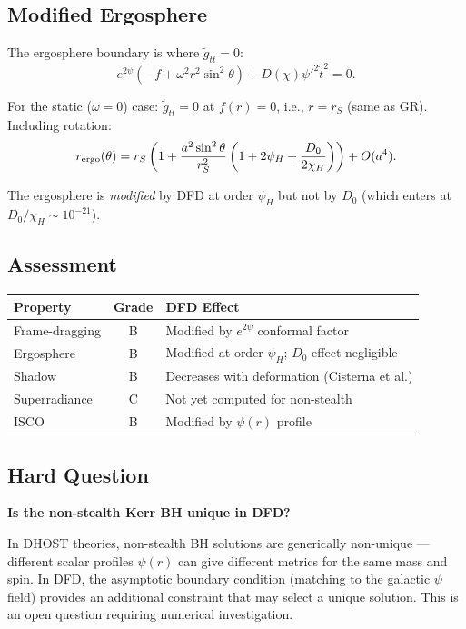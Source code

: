 \documentclass[11pt,a4paper]{article}
\begin{document}
\subsection{Modified Ergosphere}

The ergosphere boundary is where $\tilde{g}_{tt} = 0$:
\begin{equation}
e^{2\psi}\left(-f + \omega^2 r^2\sin^2\theta\right) + D(\chi)\psi'^2\dot{t}^2 = 0.
\end{equation}

For the static ($\omega = 0$) case: $\tilde{g}_{tt} = 0$ at $f(r) = 0$, i.e., $r = r_S$ (same as GR). Including rotation:
\begin{equation}
r_{\rm ergo}(\theta) = r_S\left(1 + \frac{a^2\sin^2\theta}{r_S^2}\left(1 + 2\psi_H + \frac{D_0}{2\chi_H}\right)\right) + O(a^4).
\end{equation}

The ergosphere is \emph{modified} by DFD at order $\psi_H$ but not by $D_0$ (which enters at $D_0/\chi_H \sim 10^{-21}$).

\subsection{Assessment}

\begin{center}
\begin{tabular}{lcl}
\toprule
\textbf{Property} & \textbf{Grade} & \textbf{DFD Effect} \\
\midrule
Frame-dragging & B & Modified by $e^{2\psi}$ conformal factor \\
Ergosphere & B & Modified at order $\psi_H$; $D_0$ effect negligible \\
Shadow & B & Decreases with deformation (Cisterna et al.) \\
Superradiance & C & Not yet computed for non-stealth \\
ISCO & B & Modified by $\psi(r)$ profile \\
\bottomrule
\end{tabular}
\end{center}

\subsection{Hard Question}

\textbf{Is the non-stealth Kerr BH unique in DFD?}

In DHOST theories, non-stealth BH solutions are generically non-unique --- different scalar profiles $\psi(r)$ can give different metrics for the same mass and spin. In DFD, the asymptotic boundary condition (matching to the galactic $\psi$ field) provides an additional constraint that may select a unique solution. This is an open question requiring numerical investigation.
\end{document}
